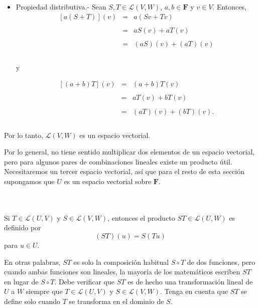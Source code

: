 \begin{myteo}
\begin{itemize}
	    \item Propiedad distributiva.- Sean $S,T\in \mathcal{L}(V,W)$, $a,b\in \textbf{F}$ y $v\in V$. Entonces,
		$$
		\begin{array}{rcl}
		    \left[a(S+T)\right](v) &=& a(Sv+Tv)\\\\
					   &=& aS(v)+aT(v)\\\\
					   &=& (aS)(v)+(aT)(v)\\\\
		\end{array}
		$$
		\begin{center}
		    y
		\end{center}

		$$
		\begin{array}{rcl}
		    \left[(a+b)T\right](v) &=& (a+b)T(v)\\\\
					   &=& aT(v)+bT(v)\\\\
					   &=& (aT)(v)+(bT)(v).\\\\
		\end{array}
		$$
		
	\end{itemize}

	Por lo tanto, $\mathcal{L}(V,W)$ es un espacio vectorial.
\end{myteo}


Por lo general, no tiene sentido multiplicar dos elementos de un espacio vectorial, pero para algunos pares de combinaciones lineales existe un producto útil. Necesitaremos un tercer espacio vectorial, así que para el resto de esta sección supongamos que $U$ es un espacio vectorial sobre $\textbf{F}$.

\begin{mydef}\,\\\\
    Si $T\in \mathcal{L}(U,V)$ y $S\in \mathcal{L}(V,W)$, entonces el producto $ST\in \mathcal{L}(U,W)$ es definido por
    $$(ST)(u)=S(Tu)$$
    para $u\in U$.
\end{mydef}

En otras palabras, $ST$ es solo la composición habitual $S\circ T$ de dos funciones, pero cuando ambas funciones son lineales, la mayoría de los matemáticos escriben $ST$ en lugar de $S\circ T$. Debe verificar que $ST$ es de hecho una transformación lineal de $U$ a $W$ siempre que $T\in \mathcal{L}(U,V)$ y $S\in \mathcal{L}(V,W)$. Tenga en cuenta que $ST$ se define solo cuando $T$ se transforma en el dominio de $S$.

